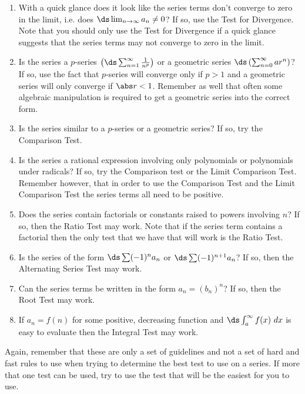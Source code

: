 \begin{enumerate}
\item With a quick glance does it look like the series terms don't converge to zero in the limit, i.e. does $\ds \lim_{n\to \infty}a_n \neq 0$? If so, use the Test for Divergence. Note that you should only use the Test for Divergence if a quick glance suggests that the series terms may not converge to zero in the limit.

\item Is the series a $p$-series $\left(\ds \sum_{n=1}^\infty \frac{1}{n^p}\right)$ or a geometric series $\ds \left( \sum_{n=0}^\infty ar^n\right)$? If so, use the fact that $p$-series will converge only  if $p>1$ and a geometric series will only converge if $\abs r<1$. Remember as well that often some algebraic manipulation is required to get a geometric series into the correct form.

\item Is the series similar to a $p$-series or a geometric series? If so, try the Comparison Test.

\item Is the series a rational expression involving only polynomials or polynomials under radicals? If so, try the Comparison test or the Limit Comparison Test. Remember however, that in order to use the Comparison Test and the Limit Comparison Test the series terms all need to be positive.

\item Does the series contain factorials or constants raised to powers involving $n$? If so, then the Ratio Test may work. Note that if the series term contains a factorial then the only test that we have that will work is the Ratio Test.

\item Is the series of the form $\ds \sum (-1)^n a_n$ or $\ds\sum (-1)^{n+1} a_n$? If so, then the Alternating Series Test may work.

\item Can the series terms be written in the form $a_n=(b_n)^n$? If so, then the Root Test may work.

\item If $a_n=f(n)$ for some positive, decreasing function and $\ds \int_a^\infty f(x)~dx$ is easy to evaluate then the Integral Test may work.
\end{enumerate}

Again, remember that these are only a set of guidelines and not a set of hard and fast rules to use when trying to determine the best test to use on a series. If more that one test can be used, try to use the test that will be the easiest for you to use.


